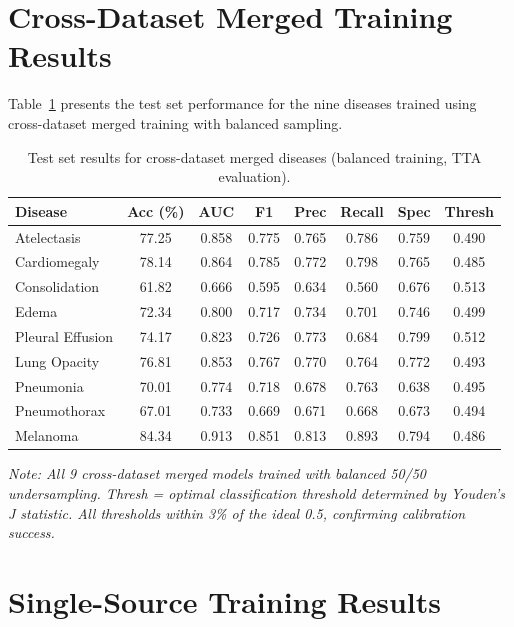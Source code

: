 \documentclass[12pt,a4paper]{report}
\begin{document}
\section{Cross-Dataset Merged Training Results}

Table~\ref{tab:merged_results} presents the test set performance for the nine diseases trained using cross-dataset merged training with balanced sampling.

\begin{table}[H]
\centering
\caption{Test set results for cross-dataset merged diseases (balanced training, TTA evaluation).}
\label{tab:merged_results}
\begin{tabular}{@{}lccccccc@{}}
\toprule
\textbf{Disease} & \textbf{Acc (\%)} & \textbf{AUC} & \textbf{F1} & \textbf{Prec} & \textbf{Recall} & \textbf{Spec} & \textbf{Thresh} \\
\midrule
Atelectasis & 77.25 & 0.858 & 0.775 & 0.765 & 0.786 & 0.759 & 0.490 \\
Cardiomegaly & 78.14 & 0.864 & 0.785 & 0.772 & 0.798 & 0.765 & 0.485 \\
Consolidation & 61.82 & 0.666 & 0.595 & 0.634 & 0.560 & 0.676 & 0.513 \\
Edema & 72.34 & 0.800 & 0.717 & 0.734 & 0.701 & 0.746 & 0.499 \\
Pleural Effusion & 74.17 & 0.823 & 0.726 & 0.773 & 0.684 & 0.799 & 0.512 \\
Lung Opacity & 76.81 & 0.853 & 0.767 & 0.770 & 0.764 & 0.772 & 0.493 \\
Pneumonia & 70.01 & 0.774 & 0.718 & 0.678 & 0.763 & 0.638 & 0.495 \\
Pneumothorax & 67.01 & 0.733 & 0.669 & 0.671 & 0.668 & 0.673 & 0.494 \\
Melanoma & 84.34 & 0.913 & 0.851 & 0.813 & 0.893 & 0.794 & 0.486 \\
\bottomrule
\end{tabular}

\vspace{0.3cm}
\footnotesize{\textit{Note: All 9 cross-dataset merged models trained with balanced 50/50 undersampling. Thresh = optimal classification threshold determined by Youden's J statistic. All thresholds within 3\% of the ideal 0.5, confirming calibration success.}}
\end{table}

\section{Single-Source Training Results}
\end{document}

